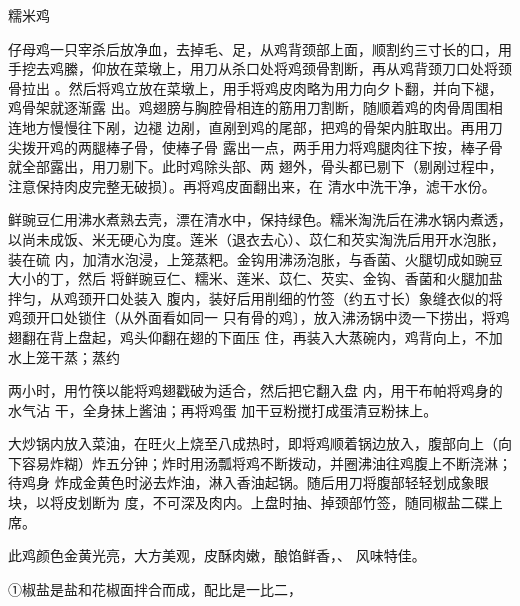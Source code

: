 \begin{recipe}[八宝糯米鸡]{糯米鸡}

\ingredients


\preparation

\step 仔母鸡一只宰杀后放净血，去掉毛、足，从鸡背颈部上面，顺割约三寸长的口，用
手挖去鸡縢，仰放在菜墩上，用刀从杀口处将鸡颈骨割断，再从鸡背颈刀口处将颈骨拉出
。然后将鸡立放在菜墩上，用手将鸡皮肉略为用力向夕卜翻，并向下褪，鸡骨架就逐渐露
出。鸡翅膀与胸腔骨相连的筋用刀割断，随顺着鸡的肉骨周围相连地方慢慢往下剐，边褪
边剐，直剐到鸡的尾部，把鸡的骨架内脏取出。再用刀尖拨开鸡的两腿棒子骨，使棒子骨
露出一点，两手用力将鸡腿肉往下按，棒子骨就全部露出，用刀剔下。此时鸡除头部、两
翅外，骨头都已剔下（剔剐过程中，注意保持肉皮完整无破损〕。再将鸡皮面翻出来，在
清水中洗干净，滤干水份。

\step 鲜豌豆仁用沸水煮熟去壳，漂在清水中，保持绿色。糯米淘洗后在沸水锅内煮透，
以尚未成饭、米无硬心为度。莲米（退衣去心）、苡仁和芡实淘洗后用开水泡胀，装在硫
内，加清水泡浸，上笼蒸粑。金钩用沸汤泡胀，与香菌、火腿切成如豌豆大小的丁，然后
将鲜豌豆仁、糯米、莲米、苡仁、芡实、金钩、香菌和火腿加盐拌匀，从鸡颈开口处装入
腹内，装好后用削细的竹签（约五寸长）象缝衣似的将鸡颈开口处锁住（从外面看如同一
只有骨的鸡〕，放入沸汤锅中烫一下捞出，将鸡翅翻在背上盘起，鸡头仰翻在翅的下面压
住，再装入大蒸碗内，鸡背向上，不加水上笼干蒸；蒸约

两小时，用竹筷以能将鸡翅戳破为适合，然后把它翻入盘 内，用干布帕将鸡身的水气沾
干，全身抹上酱油；再将鸡蛋 加干豆粉搅打成蛋清豆粉抹上。

\step 大炒锅内放入菜油，在旺火上烧至八成热时，即将鸡顺着锅边放入，腹部向上（向
下容易炸糊）炸五分钟；炸时用汤瓢将鸡不断拨动，并圈沸油往鸡腹上不断浇淋；待鸡身
炸成金黄色时泌去炸油，淋入香油起锅。随后用刀将腹部轻轻划成象眼块，以将皮划断为
度，不可深及肉内。上盘时抽、掉颈部竹签，随同椒盐二碟上席。

\features

此鸡颜色金黄光亮，大方美观，皮酥肉嫩，酿馅鲜香，、 风味特佳。

①椒盐是盐和花椒面拌合而成，配比是一比二，

\end{recipe}

